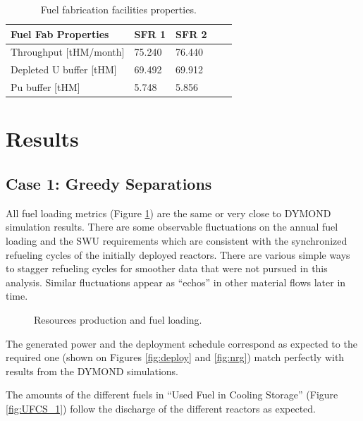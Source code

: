 \documentclass[12pt]{article}
\begin{document}
\begin{table}[h!]
    \centering
    \begin{tabular}{lllll}
    \hline
    Fuel Fab Properties      &  SFR 1   &  SFR 2   \\
    \hline
    Throughput [tHM/month]   &  75.240  &  76.440  \\
    Depleted U buffer [tHM]  &  69.492  &  69.912  \\
    Pu buffer  [tHM]         &  5.748   &  5.856   \\
    \hline
    \end{tabular}
    \caption{Fuel fabrication facilities properties.}
    \label{tab:fuelfab_1}
\end{table}


\section{Results}

\subsection{Case 1: Greedy Separations}

All fuel loading metrics (Figure \ref{fig:ResourceUsed}) are the same or very
close to DYMOND simulation results. There are some observable fluctuations on the
annual fuel loading and the SWU requirements which are consistent with the
synchronized refueling cycles of the initially deployed reactors.  There are
various simple ways to stagger refueling cycles for smoother data that were not
pursued in this analysis.  Similar fluctuations appear as ``echos'' in other
material flows later in time.

\begin{figure}[h!]
    \centering
    \caption{Resources production and fuel loading.\label{fig:ResourceUsed} }
\end{figure}

The generated power and the deployment schedule correspond as expected to the
required one (shown on Figures \ref{fig:deploy} and \ref{fig:nrg}) match
perfectly with results from the DYMOND simulations.

The amounts of the different fuels in ``Used Fuel in Cooling Storage'' (Figure
\ref{fig:UFCS_1}) follow the discharge of the different reactors as expected.
\end{document}
